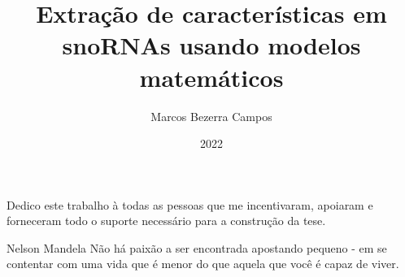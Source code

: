 \documentclass[pt,oneside,onehalfspacing,bsc]{ifbclass/ifbclass}
\title{Extração de características em snoRNAs usando modelos matemáticos}
\date{2022}
\author{Marcos Bezerra Campos}
\begin{document}
  \frontmatter
  \frontpage
  \presentationpage
  
  \begin{fichacatalografica}
  \end{fichacatalografica}
  
  
  \begin{dedicatory}
  Dedico este trabalho à todas as pessoas que me incentivaram, apoiaram e forneceram todo o suporte necessário para a construção da tese.
  \end{dedicatory}
  
  \acknowledgements
  
  
  \begin{epigraph}[]{Nelson Mandela}
  Não há paixão a ser encontrada apostando pequeno - em se contentar com uma vida que é menor do que aquela que você é capaz de viver.
  \end{epigraph}
  
  \resumo
  {\parindent0pt
    
  }
  
  \abstract
  {\parindent0pt
    
  }
  
  \listoffigures
  
  \lstlistoflistings
  
  \listoftables
  
  \listofacronyms
  
  
  \tableofcontents
  
  \mainmatter
  
  
  
  
  
  
  
  
  \begin{references}
    
  \end{references}
  
  
\end{document}
